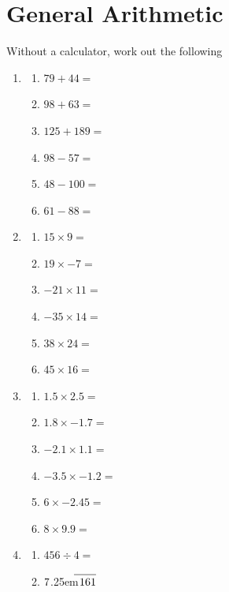 \documentclass[a4paper,12pt]{article}
\newcommand\Mydiv[2]{%
$\strut#1$\kern.25em\smash{\raise.3ex\hbox{$\big)$}}$\mkern-8mu
        \overline{\enspace\strut#2}$}
\begin{document}
\section{General Arithmetic}
Without a calculator, work out the following
\begin{enumerate}[itemsep=10mm]
\item \begin{multicols}{3}
\begin{enumerate}[label= \roman*), itemsep=4mm]
\item $79 + 44=$
\item $98 + 63=$
\item $125 + 189=$
\item $98-57=$
\item $48 - 100=$
\item $61 -88=$
\end{enumerate}
\end{multicols}
\item \begin{multicols}{3}
\begin{enumerate}[label= \roman*), itemsep=4mm]
\item $15 \times 9 =$
\item $19 \times -7 =$
\item $-21 \times 11 =$
\item $-35 \times 14=$
\item $38 \times 24=$
\item $45 \times 16=$
\end{enumerate}
\end{multicols}
\item \begin{multicols}{3}
\begin{enumerate}[label= \roman*), itemsep=4mm]
\item $1.5 \times 2.5=$
\item $1.8 \times -1.7=$
\item $-2.1 \times 1.1=$
\item $-3.5 \times -1.2=$
\item $6 \times -2.45=$
\item $8 \times 9.9=$
\end{enumerate}
\end{multicols}
\item \begin{multicols}{3}
\begin{enumerate}[label= \roman*), itemsep=4mm]
\item $456 \div 4=$
\item \Mydiv{7}{161} 

\end{enumerate}
\end{multicols}
\end{enumerate}
\end{document}
